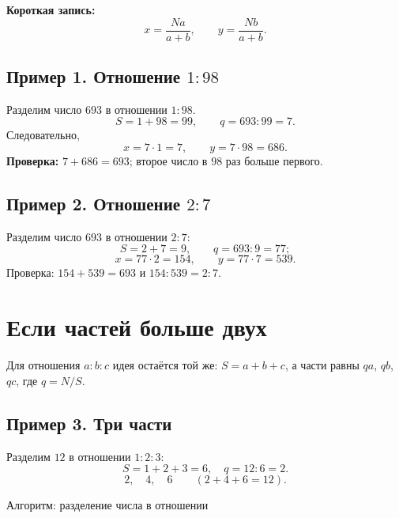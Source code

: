 \documentclass[a4paper,12pt]{article}
\newcommand{\key}[1]{\textcolor{darkaccent}{\textbf{#1}}}
\begin{document}
\key{Короткая запись:}
\[
\boxed{x=\frac{Na}{a+b},\qquad y=\frac{Nb}{a+b}.}
\]

\subsection{Пример 1. Отношение \(1:98\)}
Разделим число \(693\) в отношении \(1:98\).
\[
S=1+98=99,\qquad q=693:99=7.
\]
Следовательно,
\[
x=7\cdot1=7,\qquad y=7\cdot98=686.
\]
\key{Проверка:} \(7+686=693\); второе число в \(98\) раз больше первого.

\subsection{Пример 2. Отношение \(2:7\)}
Разделим число \(693\) в отношении \(2:7\):
\[
S=2+7=9,\qquad q=693:9=77;
\]
\[
x=77\cdot2=154,\qquad y=77\cdot7=539.
\]
Проверка: \(154+539=693\) и \(154:539=2:7\).

\section{Если частей больше двух}

Для отношения \(a:b:c\) идея остаётся той же: \(S=a+b+c\), а части равны \(qa\), \(qb\), \(qc\), где \(q=N/S\).

\subsection{Пример 3. Три части}
Разделим \(12\) в отношении \(1:2:3\):
\[
S=1+2+3=6,\quad q=12:6=2.
\]
\[
\boxed{2,\quad 4,\quad 6}\qquad (2+4+6=12).
\]
\clearpage
\thispagestyle{empty}
\begin{center}
{\Large\color{darkaccent} Алгоритм: разделение числа в отношении}
\end{center}
\vspace{14mm}
\begin{center}
\end{center}
\clearpage
\end{document}
